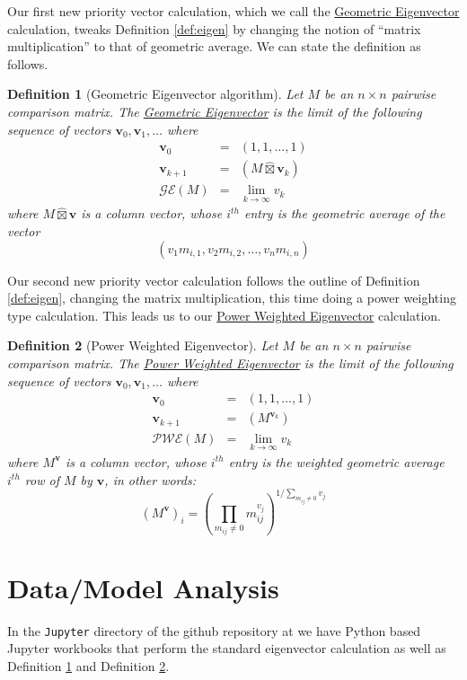 \documentclass[11pt]{article}
\newtheorem{definition}{Definition}
\begin{document}
Our first new priority vector calculation, which we call the \ul{Geometric Eigenvector} 
calculation, tweaks Definition \ref{def:eigen} by changing the notion of ``matrix
multiplication'' to that of geometric average.  We can state the definition as follows.
\begin{definition}[Geometric Eigenvector algorithm]
	\label{def:geigen}
	Let $M$ be an $n \times n$ pairwise comparison matrix.  The 
	\ul{Geometric Eigenvector} is the limit of the following sequence of
	vectors $\mathbf{v}_0, \mathbf{v}_1, \ldots$ where
	\begin{eqnarray*}
		\mathbf{v}_0 &=& (1, 1, \ldots, 1) \\
		\mathbf{v}_{k+1} &=& (M \widehat{\boxtimes} \mathbf{v}_k) \\
		\mathcal{GE}(M) &=& \lim_{k\to \infty} v_k
	\end{eqnarray*}
	where $M \widehat{\boxtimes} \mathbf{v}$ is a column vector, whose $i^{th}$ entry
	is the geometric average of the vector
	$$\left(v_1 m_{i,1}, v_2 m_{i,2}, \ldots, v_n m_{i,n}\right)$$	
\end{definition}

Our second new priority vector calculation follows the outline of Definition 
\ref{def:eigen}, changing the matrix multiplication, this time doing
a power weighting type calculation.  This leads us to our \ul{Power Weighted Eigenvector} calculation.

\begin{definition}[Power Weighted Eigenvector]
	\label{def:pweigen}
	Let $M$ be an $n \times n$ pairwise comparison matrix.  The 
	\ul{Power Weighted Eigenvector} is the limit of the following sequence of
	vectors $\mathbf{v}_0, \mathbf{v}_1, \ldots$ where
	\begin{eqnarray*}
		\mathbf{v}_0 &=& (1, 1, \ldots, 1) \\
		\mathbf{v}_{k+1} &=& (M ^ {\mathbf{v}_k}) \\
		\mathcal{PWE}(M) &=& \lim_{k\to \infty} v_k
	\end{eqnarray*}
	where $M ^{\mathbf{v}}$ is a column vector, whose $i^{th}$ entry
	is the weighted geometric average $i^{th}$ row of $M$ by $\mathbf{v}$, in
	other words:
	$$\left(M^{\mathbf{v}}\right)_i = \left(\prod_{m_{ij}\neq 0} m_{ij}^{v_j}\right) ^{1/\sum_{m_{ij}\neq 0} v_j} $$
	
\end{definition}

\section{Data/Model Analysis}
In the \texttt{Jupyter} directory of the github repository at \cite{githubahppri}
we have Python based Jupyter workbooks that perform the standard eigenvector 
calculation as well as Definition \ref{def:geigen} and Definition \ref{def:pweigen}.
\end{document}
